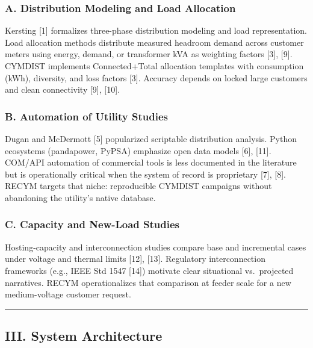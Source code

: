 \documentclass[
  11pt,
]{article}
\begin{document}
\subsubsection{A. Distribution Modeling and Load
Allocation}\label{a.-distribution-modeling-and-load-allocation}

Kersting {[}1{]} formalizes three-phase distribution modeling and load
representation. Load allocation methods distribute measured headroom
demand across customer meters using energy, demand, or transformer kVA
as weighting factors {[}3{]}, {[}9{]}. CYMDIST implements
Connected+Total allocation templates with consumption (kWh), diversity,
and loss factors {[}3{]}. Accuracy depends on locked large customers and
clean connectivity {[}9{]}, {[}10{]}.

\subsubsection{B. Automation of Utility
Studies}\label{b.-automation-of-utility-studies}

Dugan and McDermott {[}5{]} popularized scriptable distribution
analysis. Python ecosystems (pandapower, PyPSA) emphasize open data
models {[}6{]}, {[}11{]}. COM/API automation of commercial tools is less
documented in the literature but is operationally critical when the
system of record is proprietary {[}7{]}, {[}8{]}. RECYM targets that
niche: reproducible CYMDIST campaigns without abandoning the utility’s
native database.

\subsubsection{C. Capacity and New-Load
Studies}\label{c.-capacity-and-new-load-studies}

Hosting-capacity and interconnection studies compare base and
incremental cases under voltage and thermal limits {[}12{]}, {[}13{]}.
Regulatory interconnection frameworks (e.g., IEEE Std 1547 {[}14{]})
motivate clear situational vs.~projected narratives. RECYM
operationalizes that comparison at feeder scale for a new medium-voltage
customer request.

\begin{center}\rule{0.5\linewidth}{0.5pt}\end{center}

\subsection{III. System Architecture}\label{iii.-system-architecture}
\end{document}
